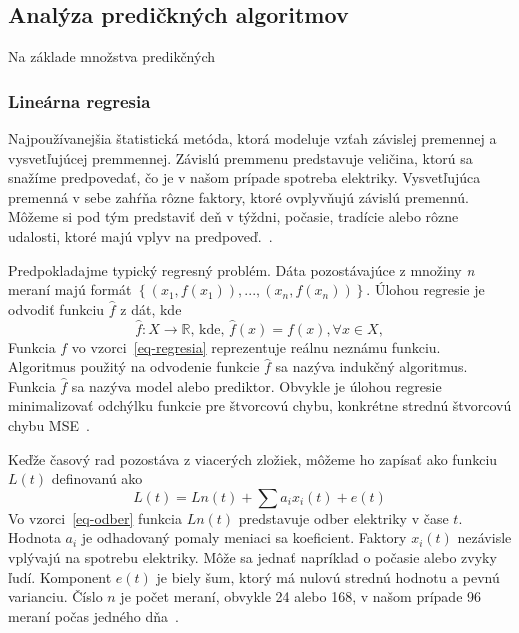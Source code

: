 \documentclass[a4paper,slovak,12pt,appendix]{article}
\begin{document}

\subsection{Analýza predičkných algoritmov}
Na základe množstva predikčných


\subsubsection{Lineárna regresia}
Najpoužívanejšia štatistická metóda, ktorá modeluje vzťah závislej premennej
a vysvetľujúcej premmennej. Závislú premmenu predstavuje veličina, ktorú sa
snažíme predpovedať, čo je v našom prípade spotreba elektriky. Vysvetľujúca
premenná v sebe zahŕňa rôzne faktory, ktoré ovplyvňujú závislú premennú.
Môžeme si pod tým predstaviť deň v týždni, počasie, tradície alebo rôzne
udalosti, ktoré majú vplyv na predpoveď.~\cite{KumarSingh2013, Mahalakshmi2016}.

Predpokladajme typický regresný problém. Dáta pozostávajúce z množiny \textit{n}
meraní majú formát $\left\{(x_1, f(x_1)), ..., (x_n, f(x_n))\right\}$.
Úlohou regresie je odvodiť funkciu $\hat{f}$ z dát, kde
\begin{equation}
  \hat{f} : X \to \mathbb{R} \text{, kde, } \hat{f}(x) = f(x), \forall x \in X,
  \label{eq-regresia}
\end{equation}
Funkcia $f$ vo vzorci~\ref{eq-regresia} reprezentuje reálnu neznámu
funkciu. Algoritmus použitý na odvodenie funkcie $\hat{f}$ sa nazýva
indukčný algoritmus. Funkcia $\hat{f}$ sa nazýva model alebo
prediktor. Obvykle je úlohou regresie minimalizovať odchýlku funkcie pre
štvorcovú chybu, konkrétne strednú štvorcovú chybu MSE~\cite{Mendes-Moreira2012}.

Keďže časový rad pozostáva z viacerých zložiek, môžeme ho zapísať ako funkciu
$L(t)$ definovanú ako
\begin{equation}
  L(t) = Ln(t) + \sum a_i x_i(t) + e(t)
  \label{eq-odber}
\end{equation}
Vo vzorci~\ref{eq-odber} funkcia $Ln(t)$ predstavuje odber elektriky v čase
$t$. Hodnota $a_i$ je odhadovaný pomaly meniaci sa koeficient. Faktory
$x_i(t)$ nezávisle vplývajú na spotrebu elektriky. Môže sa jednať napríklad
o počasie alebo zvyky ľudí. Komponent $e(t)$ je biely šum, ktorý má nulovú
strednú hodnotu a pevnú varianciu. Číslo $n$ je počet meraní, obvykle 24
alebo 168, v našom prípade 96 meraní počas jedného dňa~\cite{KumarSingh2013}.
\end{document}
